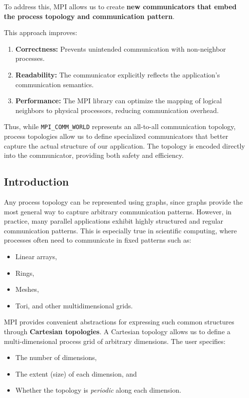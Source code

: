 \documentclass[12pt]{book}
\begin{document}
To address this, MPI allows us to create \textbf{new communicators that embed the process topology and communication pattern}.  

This approach improves:
\begin{enumerate}
    \item \textbf{Correctness:} Prevents unintended communication with non-neighbor processes.
    \item \textbf{Readability:} The communicator explicitly reflects the application's communication semantics.
    \item \textbf{Performance:} The MPI library can optimize the mapping of logical neighbors to physical processors, reducing communication overhead.
\end{enumerate}

Thus, while \texttt{MPI\_COMM\_WORLD} represents an all-to-all communication topology, process topologies allow us to define specialized communicators that better capture the actual structure of our application. The topology is encoded directly into the communicator, providing both safety and efficiency.

\subsection{Introduction}

Any process topology can be represented using graphs, since graphs provide the most general way to capture arbitrary communication patterns.  
However, in practice, many parallel applications exhibit highly structured and regular communication patterns. This is especially true in scientific computing, where processes often need to communicate in fixed patterns such as:
\begin{itemize}
    \item Linear arrays,
    \item Rings,
    \item Meshes,
    \item Tori, and other multidimensional grids.
\end{itemize}

MPI provides convenient abstractions for expressing such common structures through \textbf{Cartesian topologies}.  
A Cartesian topology allows us to define a multi-dimensional process grid of arbitrary dimensions. The user specifies:
\begin{itemize}
    \item The number of dimensions,
    \item The extent (size) of each dimension, and
    \item Whether the topology is \emph{periodic} along each dimension.
\end{itemize}
\end{document}
